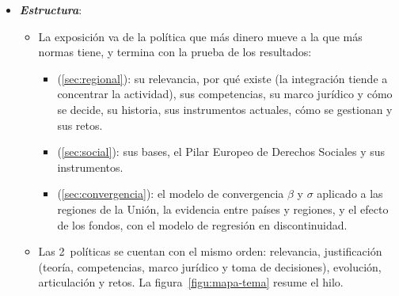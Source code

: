 \documentclass[11pt]{article}
\begin{document}
\begin{itemize}
\item \textbf{\emph{Estructura}}:
  \begin{itemize}
  \item La exposición va de la política que más dinero mueve a la que más normas tiene, y termina con la prueba de los resultados:
    \begin{itemize}
    \item {} (\ref{sec:regional}): su relevancia, por qué existe (la integración tiende a concentrar la actividad), sus competencias, su marco jurídico y cómo se decide, su historia, sus instrumentos actuales, cómo se gestionan y sus retos.
    \item {} (\ref{sec:social}): sus bases, el Pilar Europeo de Derechos Sociales y sus instrumentos.
    \item {} (\ref{sec:convergencia}): el modelo de convergencia $\beta$ y $\sigma$ aplicado a las regiones de la Unión, la evidencia entre países y regiones, y el efecto de los fondos, con el modelo de regresión en discontinuidad.
    \end{itemize}
  \item Las 2~políticas se cuentan con el mismo orden: relevancia, justificación (teoría, competencias, marco jurídico y toma de decisiones), evolución, articulación y retos. La figura~\ref{figu:mapa-tema} resume el hilo.
  \end{itemize}
\end{itemize}
\end{document}

